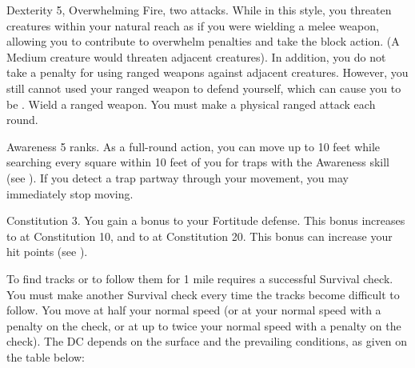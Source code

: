 \featpres Dexterity 5, Overwhelming Fire, two attacks.
\featben While in this style, you threaten creatures within your natural reach as if you were wielding a melee weapon, allowing you to contribute to overwhelm penalties and take the block action.
(A Medium creature would threaten adjacent creatures).
In addition, you do not take a  penalty for using ranged weapons against adjacent creatures.
However, you still cannot used your ranged weapon to defend yourself, which can cause you to be .
\stylereq Wield a ranged weapon.
You must make a physical ranged attack each round.

\featpre Awareness 5 ranks.
\featben As a full-round action, you can move up to 10 feet while searching every square within 10 feet of you for traps with the Awareness skill (see ).
If you detect a trap partway through your movement, you may immediately stop moving.

\featpre Constitution 3.
\featben You gain a  bonus to your Fortitude defense.
This bonus increases to  at Constitution 10, and to  at Constitution 20.
This bonus can increase your hit points (see ).

\featben To find tracks or to follow them for 1 mile requires a successful Survival check.
You must make another Survival check every time the tracks become difficult to follow.
You move at half your normal speed (or at your normal speed with a  penalty on the check, or at up to twice your normal speed with a  penalty on the check).
The DC depends on the surface and the prevailing conditions, as given on the table below:

